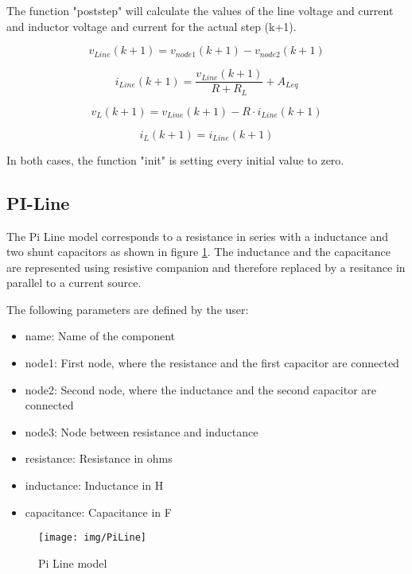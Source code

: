The function "poststep" will calculate the values of the line voltage and current and inductor voltage and current for the actual step (k+1).

\begin{equation}
	v_{Line}(k+1) = v_{node1}(k+1) - v_{node2}(k+1) 
\end{equation}

\begin{equation}
	i_{Line}(k+1) = \frac{v_{Line}(k+1)}{R+R_L} + A_{Leq} 
\end{equation}

\begin{equation}
	v_L(k+1) = v_{Line}(k+1) - R \cdot i_{Line}(k+1)
\end{equation}

\begin{equation}
	i_L(k+1) = i_{Line}(k+1)
\end{equation}

In both cases, the function "init" is setting every initial value to zero.

\subsection{PI-Line}
The Pi Line model corresponds to a resistance in series with a inductance and two shunt capacitors as shown in figure \ref{fig:PiLine}. The inductance and the capacitance are represented using resistive companion and therefore replaced by a resitance in parallel to a current source.

The following parameters are defined by the user:

\begin{itemize}
\item name: Name of the component
\item node1: First node, where the resistance and the first capacitor are connected
\item node2: Second node, where the inductance and the second capacitor are connected
\item node3: Node between resistance and inductance 
\item resistance: Resistance in ohms
\item inductance: Inductance in H
\item capacitance: Capacitance in F
\end{itemize}

\begin{figure}[h]
	\centering
	\texttt{[image: img/PiLine]} 
	\caption{Pi Line model}
	\label{fig:PiLine}
\end{figure}

